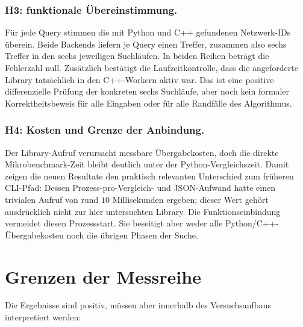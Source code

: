 \documentclass[a4paper,12pt, twoside]{report}
\theoremstyle{definition}
\begin{document}
\subsubsection{H3: funktionale Übereinstimmung.} Für jede Query stimmen die mit Python und C++ gefundenen Netzwerk-IDs überein. Beide Backends liefern je Query einen Treffer, zusammen also sechs Treffer in den sechs jeweiligen Suchläufen. In beiden Reihen beträgt die Fehlerzahl null. Zusätzlich bestätigt die Laufzeitkontrolle, dass die angeforderte Library tatsächlich in den C++-Workern aktiv war. Das ist eine positive differenzielle Prüfung der konkreten sechs Suchläufe, aber noch kein formaler Korrektheitsbeweis für alle Eingaben oder für alle Randfälle des Algorithmus.

\subsubsection{H4: Kosten und Grenze der Anbindung.} Der Library-Aufruf verursacht messbare Übergabekosten, doch die direkte Mikrobenchmark-Zeit bleibt deutlich unter der Python-Vergleichszeit. Damit zeigen die neuen Resultate den praktisch relevanten Unterschied zum früheren CLI-Pfad: Dessen Prozess-pro-Vergleich- und JSON-Aufwand hatte einen trivialen Aufruf von rund $10$ Millisekunden ergeben; dieser Wert gehört ausdrücklich nicht zur hier untersuchten Library. Die Funktionseinbindung vermeidet diesen Prozessstart. Sie beseitigt aber weder alle Python/C++-Übergabekosten noch die übrigen Phasen der Suche.

\section{Grenzen der Messreihe}
\label{sec:backend_grenzen}

Die Ergebnisse sind positiv, müssen aber innerhalb des Versuchsaufbaus interpretiert werden:
\end{document}
